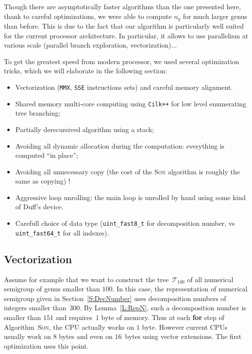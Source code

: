\documentclass[reqno,11pt]{amsart}
\theoremstyle{plain}
\theoremstyle{definition}
\newcommand{\CilkP}{\texttt{Cilk++}\xspace}
\newcommand{\MMX}{\texttt{MMX}\xspace}
\newcommand{\SSE}{\texttt{SSE}\xspace}
\begin{document}
Though there are asymptotically faster algorithms than the one presented here,
thank to careful optimizations, we were able to compute $n_g$ for much larger
genus than before. This is due to the fact that our algorithm is particularly
well suited for the current processor architecture. In particular, it allows
to use parallelism at various scale (parallel branch exploration,
vectorization)...

To get the greatest speed from modern processor, we used several optimization
tricks, which we will elaborate in the following section:


\begin{itemize}

\item Vectorization (\MMX, \SSE instructions sets) and careful memory alignment. 
\item Shared memory multi-core computing using \CilkP for low level
  enumerating tree branching;
\item Partially derecursived algorithm using a stack;
\item Avoiding all dynamic allocation during the computation: everything is
  computed ``in place'';
\item Avoiding all unnecessary copy (the cost of the \textsc{Son} algorithm is
  roughly the same as copying) !
\item Aggressive loop unrolling: the main loop is unrolled by hand using some
  kind of Duff's device.
\item Carefull choice of data type (\verb|uint_fast8_t| for decomposition
  number, vs \verb|uint_fast64_t| for all indexes).
\end{itemize}

\subsection{Vectorization}

Assume for example that we want to construct the tree~$\mathcal{T}_{100}$
of all numerical semigroup of genus smaller than $100$.  In this case, the
representation of numerical semigroup given in Section~\ref{S:DecNumber} uses
decomposition numbers of integers smaller than~$300$.  By Lemma~\ref{L:RepN},
such a decomposition number is smaller than $151$ and requires~$1$ byte of
memory.  Thus at each \textbf{for} step of Algorithm~\textsc{Son}, the CPU
actually works on $1$ byte. However current CPUs usually work on $8$ bytes and
even on $16$~bytes using vector extensions. 
The first optimization uses this point. 
\end{document}

